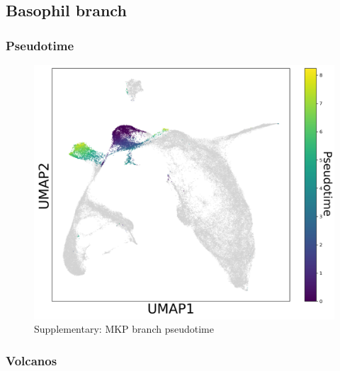 \documentclass[a4paper]{article}
\begin{document}
\FloatBarrier
\subsection{Basophil branch}

\subsubsection{Pseudotime}
\begin{figure}[!htb]
  \centering
  \includegraphics[width=\textwidth]{../figures/hematopoiesis/Basophil_40_109_single_branch_pseudotime.png}
  \caption{Supplementary: MKP branch pseudotime}
\end{figure}

\FloatBarrier
\subsubsection{Volcanos}
\end{document}
